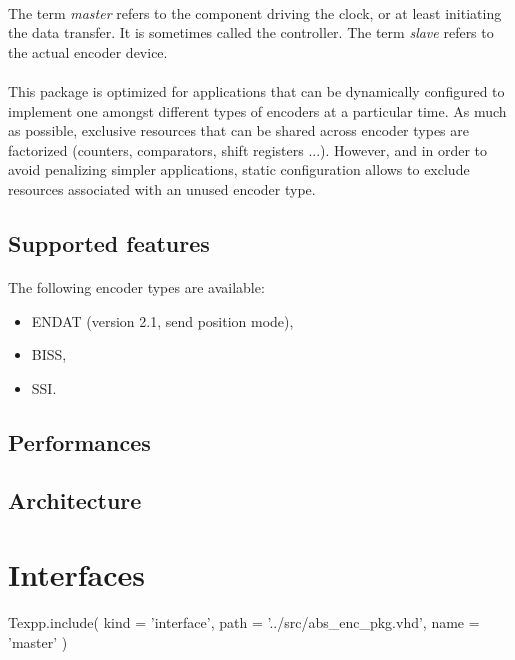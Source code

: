 \documentclass[12pt]{article}
\begin{document}
\paragraph{}
The term \textit{master} refers to the component driving the clock, or at
least initiating the data transfer. It is sometimes called the controller.
The term \textit{slave} refers to the actual encoder device.

\paragraph{}
This package is optimized for applications that can be dynamically configured
to implement one amongst different types of encoders at a particular time. As
much as possible, exclusive resources that can be shared across encoder types
are factorized (counters, comparators, shift registers ...). However, and in
order to avoid penalizing simpler applications, static configuration allows to
exclude resources associated with an unused encoder type.


\subsection{Supported features}
\todo
\paragraph{}
The following encoder types are available:
\begin{itemize}
 \item ENDAT (version 2.1, send position mode),
 \item BISS,
 \item SSI.
\end{itemize}


\subsection{Performances}
\todo


\subsection{Architecture}
\todo



\newpage
\section{Interfaces}

\begin{texpp}
Texpp.include(
 kind = 'interface',
 path = '../src/abs_enc_pkg.vhd',
 name = 'master'
)
\end{texpp}
\end{document}
